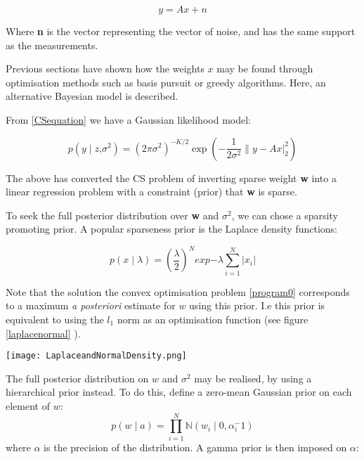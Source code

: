 \begin{equation}
y = Ax + n
\end{equation}
\label{CSequation}

Where \textbf{n} is the vector representing the vector of noise, and has the same support as the measurements. 

Previous sections have shown how the weights \(x\) may be found through optimisation methods such as basis pursuit or greedy algorithms. Here, an alternative Bayesian model is described.

From \ref{CSequation} we have a Gaussian likelihood model: 

\begin{equation}
p \left(y \mid z\text{,} \sigma^2 \right) = (2 \pi \sigma^2)^{-K/2} \exp{\left(- \frac{1}{2 \sigma^2} \|y - Ax|_{2}^{2} \right)} 
\end{equation}

The above has converted the CS problem of inverting sparse weight \textbf{w} into a linear regression problem with a constraint (prior) that \textbf{w} is sparse. 

To seek the full posterior distribution over \textbf{w} and \( \sigma^2 \), we can chose a sparsity promoting prior. A popular sparseness prior is the Laplace density functions:

\begin{equation}
p\left(x\mid\lambda\right) = \left(\frac{\lambda}{2}\right)^N exp{-\lambda \sum_{i=1}^{N} |x_i|}
\end{equation}

Note that the solution the convex optimisation problem \ref{program0} corresponds to a maximum \textit{a posteriori} estimate for \(w\) using this prior. I.e this prior is equivalent to using the \(l_1\) norm as an optimisation function (see figure \ref{laplacenormal} \cite{Tibshirani1996}).

\begin{figure*}[h]
\centering
\texttt{[image: LaplaceandNormalDensity.png]}
\caption{The Laplace (\(l_1\)-norm, bold line) and Normal (\(l_2\)-norm, dotted line) densities. Note that the Laplace density is sparsity promoting as it penalises solutions away from zero more than the Gaussian density. \cite{Tibshirani1996}}
\label{laplacenormal}
\end{figure*}

The full posterior distribution on \(w\) and \(\sigma^2\) may be realised, by using a hierarchical prior instead. To do this, define a zero-mean Gaussian prior on each element of \(w\):
%
\begin{equation}
p\left(w\mid a\right) = \prod_{i=1}^{N}\mathbb{N}\left(w_i\mid 0, \alpha_{i}^-1\right)
\end{equation}
%
where \(\alpha\) is the precision of the distribution. A gamma prior is then imposed on \(\alpha\):

